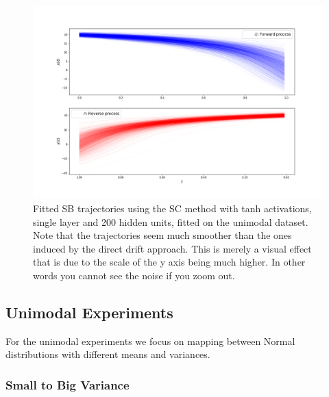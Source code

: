 \documentclass[a4paper,12pt,twoside,openright]{report}
\theoremstyle{definition}
\begin{document}
\begin{figure}
    \centering
    \includegraphics[scale=0.4,trim={2.3cm 1.9cm 2.5cm 2cm}, clip]{images/Control/big_var_marginals_best_tanh_trajectories.png}
    \caption{ Fitted SB trajectories using the SC method with tanh activations, single layer and 200 hidden units, fitted on the unimodal dataset. Note that the trajectories seem much smoother than the ones induced by the direct drift approach. This is merely a visual effect that is due to the scale of the y axis being much higher. In other words you cannot see the noise if you zoom out.}
    \label{fig:trajectoriesbigvarnn}
\end{figure}
\subsection{Unimodal Experiments}
For the unimodal experiments we focus on mapping between Normal distributions with different means and variances.
\subsubsection{Small to Big Variance}
\end{document}
